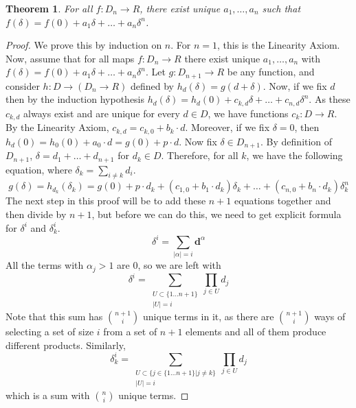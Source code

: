 \documentclass[]{book}
\newtheorem{thm}{Theorem}
\newcommand{\abs}[1]{\left\lvert #1 \right\rvert}
\begin{document}
\begin{thm}
  For all $f : D_n \to R$, there exist unique $a_1, \ldots, a_n$ such that $f(\delta) = f(0) + a_1\delta + \ldots + a_n\delta^n$.
\end{thm}
\begin{proof}
  We prove this by induction on $n$. For $n = 1$, this is the Linearity Axiom. Now, assume that for all maps $f : D_n \to R$ there exist unique $a_1,\ldots,a_n$ with $f(\delta) = f(0) + a_1\delta + \ldots + a_n\delta^n$. Let $g : D_{n+1} \to R$ be any function, and consider $h : D \to (D_n \to R)$ defined by $h_d(\delta) = g(d + \delta)$. Now, if we fix $d$ then by the induction hypothesis $h_d(\delta) = h_d(0) + c_{k,d}\delta + \ldots + c_{n,d}\delta^n$. As these $c_{k,d}$ always exist and are unique for every $d \in D$, we have functions $c_k : D \to R$. By the Linearity Axiom, $c_{k,d} = c_{k,0} + b_k \cdot d$. Moreover, if we fix $\delta = 0$, then $h_d(0) = h_0(0) + a_0 \cdot d = g(0) + p \cdot d$. Now fix $\delta \in D_{n+1}$. By definition of $D_{n+1}$, $\delta = d_1 + \ldots + d_{n+1}$ for $d_k \in D$. Therefore, for all $k$, we have the following equation, where $\delta_k = \sum_{i \neq k}d_i$.
  \[ g(\delta) = h_{d_k}(\delta_k) = g(0) + p \cdot d_k + (c_{1,0} + b_1 \cdot d_k)\delta_k + \ldots + (c_{n,0} + b_n \cdot d_k)\delta_k^n \]
  The next step in this proof will be to add these $n+1$ equations together and then divide by $n+1$, but before we can do this, we need to get explicit formula for $\delta^i$ and $\delta_k^i$.
  \[ \delta^i = \sum_{\abs{\alpha} = i} \mathbf{d}^\alpha \]
  All the terms with $\alpha_j > 1$ are 0, so we are left with
  \[ \delta^i = \sum_{\substack{U \subset \{1 \ldots n+1\} \\ \abs{U} = i}}\prod_{j \in U}d_j\]
  Note that this sum has $\binom{n+1}{i}$ unique terms in it, as there are $\binom{n+1}{i}$ ways of selecting a set of size $i$ from a set of $n+1$ elements and all of them produce different products. Similarly,
  \[ \delta_k^i = \sum_{\substack{ U \subset \{j \in \{1 \ldots n+1\}| j \neq k\} \\ \abs{U} = i }}\prod_{j \in U}d_j \]
  which is a sum with $\binom{n}{i}$ unique terms.


\end{proof}
\end{document}
